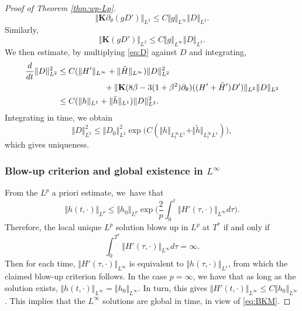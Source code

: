 \documentclass[10pt]{amsart}
\theoremstyle{plain}
\theoremstyle{definition}
\newcommand{\nrm}[1]{\Vert#1\Vert}
\let\rd\partial
\let\bt\beta
\let\tht\theta
\newcommand{\bfK}{{\mathbf K}}
\begin{document}
\begin{proof}[Proof of Theorem \ref{thm:wp-Lp}]
\begin{equation*}
\nrm{ \bfK\rd_\tht (g D') }_{L^2} \le C\nrm{g}_{L^\infty} \nrm{D}_{L^2}.
\end{equation*}
Similarly,
\begin{equation*}
\nrm{ \bfK (g D') }_{L^2} \le C\nrm{g}_{L^\infty} \nrm{D}_{L^2}.
\end{equation*}
We then estimate, by multiplying \eqref{eq:D} against $D$ and integrating,
\begin{equation*}
\begin{split}
\frac{d}{dt} \nrm{D}_{L^2}^2 &\le C(\nrm{H'}_{L^\infty} + \nrm{\tilde{H}}_{L^\infty}) \nrm{D}_{L^2}^2\\
&\hspace*{2cm}+ \nrm{ \bfK(8\bt -3(1+\bt^2)\rd_\tht) ((H'+ \tilde{H}')D') }_{L^2} \nrm{D}_{L^2} \\
& \le C(\nrm{h}_{L^1} + \nrm{\tilde{h}}_{L^1}) \nrm{D}_{L^2}^2.
\end{split}
\end{equation*}
Integrating in time, we obtain
\begin{equation*}
\nrm{D}_{L^2}^2 \le \nrm{D_0}_{L^2}^2 \exp\bigl(C(\nrm{h}_{L^\infty_t L^1} + \nrm{\tilde{h}}_{L^\infty_t L^1}) \bigr),
\end{equation*}
which gives uniqueness.

\subsubsection{Blow-up criterion and global existence in $L^\infty$}
From the $L^p$ a priori estimate, we~have that
\begin{equation*}
\nrm{h(t,\cdot)}_{L^p} \le \nrm{h_0}_{L^p} \exp\biggl(\frac{2}{p} \int_0^t \nrm{H'(\tau,\cdot)}_{L^\infty} d\tau \biggr).
\end{equation*}
Therefore, the local unique $L^p$ solution blows up in $L^p$ at $T^*$ if and only if
\begin{equation}\label{eq:BKM}
\int_0^{T^*}\nrm{H'(\tau,\cdot)}_{L^\infty} d\tau=\infty.
\end{equation}
Then for each time, $\nrm{H'(\tau,\cdot)}_{L^\infty}$ is equivalent to $\nrm{h(\tau,\cdot)}_{L^1}$, from which the claimed blow-up criterion follows. In the case $p=\infty$, we have that as long as the solution exists, $\nrm{h(t,\cdot)}_{L^\infty} = \nrm{h_0}_{L^\infty}$. In turn, this gives $\nrm{H'(t,\cdot)}_{L^\infty} \le C\nrm{h_0}_{L^\infty}$. This implies that the $L^\infty$ solutions are global in time, in view of \eqref{eq:BKM}.
\end{proof}
\end{document}
